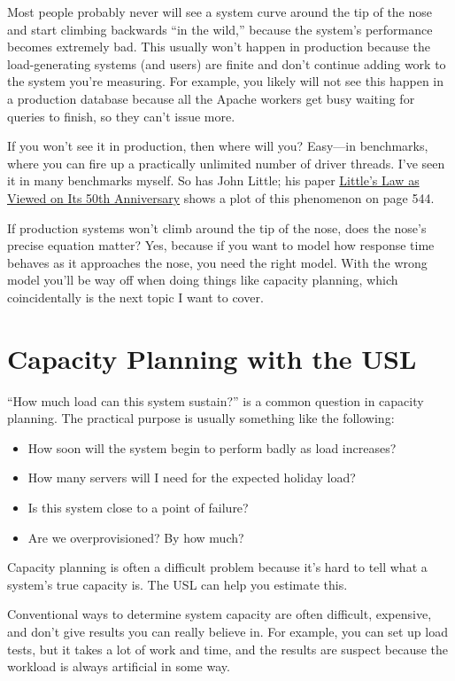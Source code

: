 \documentclass{vivid_layout}
\begin{document}
Most people probably never will see a system curve around the tip of the nose
and start climbing backwards ``in the wild,'' because the system's performance
becomes extremely bad.  This usually won't happen in production because the
load-generating systems (and users) are finite and don't continue adding work to
the system you're measuring. For example, you likely will not see this happen in
a production database because all the Apache workers get busy waiting for
queries to finish, so they can't issue more.

If you won't see it in production, then where will you? Easy---in benchmarks,
where you can fire up a practically unlimited number of driver threads. I've
seen it in many benchmarks myself. So has John Little; his paper
\href{https://people.cs.umass.edu/~emery/classes/cmpsci691st/readings/OS/Littles-Law-50-Years-Later.pdf}{Little’s
Law as Viewed on Its 50th Anniversary} shows a plot of this phenomenon on page
544.

If production systems won't climb around the tip of the nose, does the nose's
precise equation matter? Yes, because if you want to model how response time
behaves as it approaches the nose, you need the right model. With the wrong
model you'll be way off when doing things like capacity planning, which
coincidentally is the next topic I want to cover.

\section{Capacity Planning with the USL}

``How much load can this system sustain?'' is a common question in capacity
planning. The practical purpose is usually something like the following:

\begin{itemize}
\item How soon will the system begin to perform badly as load increases?
\item How many servers will I need for the expected holiday load?
\item Is this system close to a point of failure?
\item Are we overprovisioned? By how much?
\end{itemize}

Capacity planning is often a difficult problem because it's hard to tell what a
system's true capacity is. The USL can help you estimate this.

Conventional ways to determine system capacity are often difficult, expensive,
and don't give results you can really believe in. For example, you can set up
load tests, but it takes a lot of work and time, and the results are suspect
because the workload is always artificial in some way.
\end{document}
